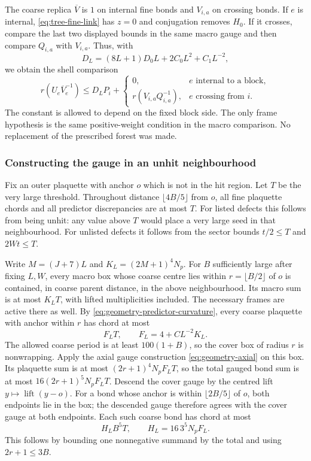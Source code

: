The coarse replica $\overline V$ is $1$ on internal fine bonds and
$V_{i,a}$ on crossing bonds. If $e$ is internal,
\eqref{eq:tree-fine-link} has $z=0$ and conjugation removes $H_0$.
If it crosses, compare the last two displayed bounds in the same
macro gauge and then compare $Q_{i,a}$ with $V_{i,a}$. Thus, with
\[
 D_L=(8L+1)D_0L+2C_0L^2+C_1L^{-2},
\]
we obtain the shell comparison
\begin{equation}\label{eq:tree-shell}
 r(U_e\overline V_e^{-1})\le D_LP_i+
 \begin{cases}
 0,& e\text{ internal to a block},\\
 r(V_{i,a}Q_{i,a}^{-1}),&e\text{ crossing from }i.
 \end{cases}
\end{equation}
The constant is allowed to depend on the fixed block side. The only
frame hypothesis is the same positive-weight condition in the macro
comparison. No replacement of the prescribed forest was made.

\subsubsection{Constructing the gauge in an unhit neighbourhood}
Fix an outer plaquette with anchor $o$ which is not in the hit region.
Let $T$ be the very large threshold. Throughout distance
$\lfloor4B/5\rfloor$ from $o$, all fine plaquette chords and all
predictor discrepancies are at most $T$. For listed defects this
follows from being unhit: any value above $T$ would place a very
large seed in that neighbourhood. For unlisted defects it follows
from the sector bounds $t/2\le T$ and $2Wt\le T$.

Write $M=(J+7)L$ and $K_L=(2M+1)^4N_p$. For $B$ sufficiently large
after fixing $L,W$, every macro box whose coarse centre lies within
$r=\lfloor B/2\rfloor$ of $o$ is contained, in coarse parent
distance, in the above neighbourhood. Its macro sum is at most
$K_LT$, with lifted multiplicities included. The necessary frames
are active there as well. By
\eqref{eq:geometry-predictor-curvature}, every coarse plaquette with
anchor within $r$ has chord at most
\[
 F_LT,\qquad F_L=4+CL^{-2}K_L.
\]
The allowed coarse period is at least $100(1+B)$, so the cover box
of radius $r$ is nonwrapping. Apply the axial gauge construction
\eqref{eq:geometry-axial} on this box. Its plaquette sum is at most
$(2r+1)^4N_pF_LT$, so the total gauged bond sum is at most
$16(2r+1)^5N_pF_LT$. Descend the cover gauge by the centred lift
$y\mapsto\operatorname{lift}(y-o)$. For a bond whose anchor is
within $\lfloor2B/5\rfloor$ of $o$, both endpoints lie in the box;
the descended gauge therefore agrees with the cover gauge at both
endpoints. Each such coarse bond has chord at most
\begin{equation}\label{eq:tree-coarse-small}
 H_L B^5T,\qquad H_L=16\,3^5N_pF_L.
\end{equation}
This follows by bounding one nonnegative summand by the total and
using $2r+1\le3B$.

